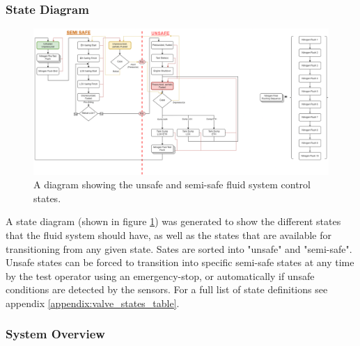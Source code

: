     \subsubsection{State Diagram}

        \begin{figure}[H]
            \centering
            \includegraphics[width=1\textwidth]{figures/Fluid_States_blockdiagram_v3.png}
            \caption{A diagram showing the unsafe and semi-safe fluid system control states.}
            \label{fig:state_diagram}
        \end{figure}

        A state diagram (shown in figure \ref{fig:state_diagram}) was generated to show the different states that the fluid system should have, as well as the states that are available for transitioning from any given state. Sates are sorted into "unsafe" and "semi-safe". Unsafe states can be forced to transition into specific semi-safe states at any time by the test operator using an emergency-stop, or automatically if unsafe conditions are detected by the sensors. For a full list of state definitions see appendix \ref{appendix:valve_states_table}.

    \subsubsection{System Overview}

